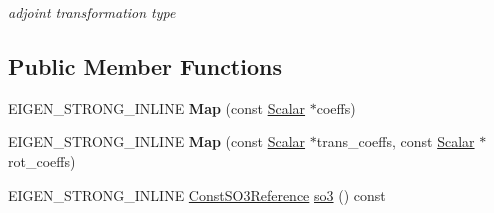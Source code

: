 \begin{DoxyCompactItemize}
\begin{DoxyCompactList}\small\item\em adjoint transformation type \end{DoxyCompactList}\end{DoxyCompactItemize}
\subsection*{Public Member Functions}
\begin{DoxyCompactItemize}
\item 
E\+I\+G\+E\+N\+\_\+\+S\+T\+R\+O\+N\+G\+\_\+\+I\+N\+L\+I\+NE {\bfseries Map} (const \hyperlink{class_eigen_1_1_map_3_01const_01_sophus_1_1_s_e3_group_3_01___scalar_01_4_00_01___options_01_4_a24b7cfd38fbe43026ced1fab3cc19584}{Scalar} $\ast$coeffs)\hypertarget{class_eigen_1_1_map_3_01const_01_sophus_1_1_s_e3_group_3_01___scalar_01_4_00_01___options_01_4_a5b85ade38803ccbcb43db362c799f1ac}{}\label{class_eigen_1_1_map_3_01const_01_sophus_1_1_s_e3_group_3_01___scalar_01_4_00_01___options_01_4_a5b85ade38803ccbcb43db362c799f1ac}

\item 
E\+I\+G\+E\+N\+\_\+\+S\+T\+R\+O\+N\+G\+\_\+\+I\+N\+L\+I\+NE {\bfseries Map} (const \hyperlink{class_eigen_1_1_map_3_01const_01_sophus_1_1_s_e3_group_3_01___scalar_01_4_00_01___options_01_4_a24b7cfd38fbe43026ced1fab3cc19584}{Scalar} $\ast$trans\+\_\+coeffs, const \hyperlink{class_eigen_1_1_map_3_01const_01_sophus_1_1_s_e3_group_3_01___scalar_01_4_00_01___options_01_4_a24b7cfd38fbe43026ced1fab3cc19584}{Scalar} $\ast$rot\+\_\+coeffs)\hypertarget{class_eigen_1_1_map_3_01const_01_sophus_1_1_s_e3_group_3_01___scalar_01_4_00_01___options_01_4_abacab3585fcd9458fec27e6b8f35c8ee}{}\label{class_eigen_1_1_map_3_01const_01_sophus_1_1_s_e3_group_3_01___scalar_01_4_00_01___options_01_4_abacab3585fcd9458fec27e6b8f35c8ee}

\item 
E\+I\+G\+E\+N\+\_\+\+S\+T\+R\+O\+N\+G\+\_\+\+I\+N\+L\+I\+NE \hyperlink{class_eigen_1_1_map_3_01const_01_sophus_1_1_s_e3_group_3_01___scalar_01_4_00_01___options_01_4_adfa2d5c638577360f8069013cc5059aa}{Const\+S\+O3\+Reference} \hyperlink{class_eigen_1_1_map_3_01const_01_sophus_1_1_s_e3_group_3_01___scalar_01_4_00_01___options_01_4_a921b87abc465b3242ed2481e58e695a0}{so3} () const \hypertarget{class_eigen_1_1_map_3_01const_01_sophus_1_1_s_e3_group_3_01___scalar_01_4_00_01___options_01_4_a921b87abc465b3242ed2481e58e695a0}{}\label{class_eigen_1_1_map_3_01const_01_sophus_1_1_s_e3_group_3_01___scalar_01_4_00_01___options_01_4_a921b87abc465b3242ed2481e58e695a0}


\end{DoxyCompactItemize}
